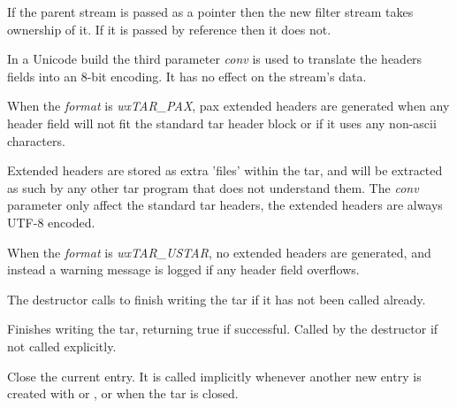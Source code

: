 

\label{wxtaroutputstreamwxtaroutputstream}



If the parent stream is passed as a pointer then the new filter stream
takes ownership of it. If it is passed by reference then it does not.

In a Unicode build the third parameter {\it conv} is used to translate the
headers fields into an 8-bit encoding. It has no effect on the stream's data.

When the {\it format} is {\it wxTAR\_PAX}, pax extended headers are generated
when any header field will not fit the standard tar header block or if it
uses any non-ascii characters.

Extended headers are stored as extra 'files' within the tar, and will be
extracted as such by any other tar program that does not understand them.
The {\it conv} parameter only affect the standard tar headers, the extended
headers are always UTF-8 encoded.

When the {\it format} is {\it wxTAR\_USTAR}, no extended headers are
generated, and instead a warning message is logged if any header field
overflows.


\label{wxtaroutputstreamdtor}


The destructor calls  to finish
writing the tar if it has not been called already.


\label{wxtaroutputstreamclose}


Finishes writing the tar, returning true if successful.
Called by the destructor if not called explicitly.


\label{wxtaroutputstreamcloseentry}


Close the current entry. It is called implicitly whenever another new
entry is created with 
or , or
when the tar is closed.


